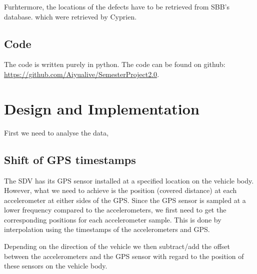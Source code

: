 
Furhtermore, the locations of the defects have to be retrieved from SBB's database. which were retrieved by Cyprien.



\section{Code}
The code is written purely in python. The code can be found on github: \\
\url{https://github.com/Aiyualive/SemesterProject2.0}.



\chapter{Design and Implementation}




First we need to analyse the data, 

 
\section{Shift of GPS timestamps}
The SDV has its GPS sensor installed at a specified location on the vehicle body. However, what we need to achieve is the position (covered distance) at each accelerometer at either sides of the GPS. Since the GPS sensor is sampled at a lower frequency compared to the accelerometers, we first need to get the corresponding positions for each accelerometer sample. This is done by interpolation using the timestamps of the accelerometers and GPS. 

Depending on the direction of the vehicle we then subtract/add the offset between the accelerometers and the GPS sensor with regard to the position of these sensors on the vehicle body.


